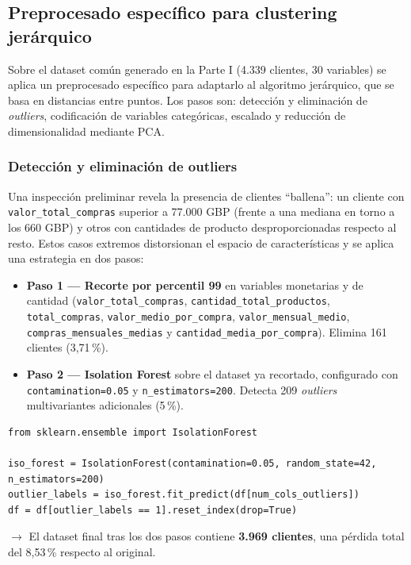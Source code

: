 \documentclass[11pt,a4paper]{article}
\begin{document}
\subsection{Preprocesado específico para clustering jerárquico}

Sobre el dataset común generado en la Parte I (4.339 clientes, 30 variables) se aplica un preprocesado específico para adaptarlo al algoritmo jerárquico, que se basa en distancias entre puntos. Los pasos son: detección y eliminación de \textit{outliers}, codificación de variables categóricas, escalado y reducción de dimensionalidad mediante PCA.

\subsubsection{Detección y eliminación de outliers}

Una inspección preliminar revela la presencia de clientes ``ballena'': un cliente con \texttt{valor\_total\_compras} superior a 77.000 GBP (frente a una mediana en torno a los 660 GBP) y otros con cantidades de producto desproporcionadas respecto al resto. Estos casos extremos distorsionan el espacio de características y se aplica una estrategia en dos pasos:

\begin{itemize}
    \item \textbf{Paso 1 — Recorte por percentil 99} en variables monetarias y de cantidad (\texttt{valor\_total\_compras}, \texttt{cantidad\_total\_productos}, \texttt{total\_compras}, \texttt{valor\_medio\_por\_compra}, \texttt{valor\_mensual\_medio}, \texttt{compras\_mensuales\_medias} y \texttt{cantidad\_media\_por\_compra}). Elimina 161 clientes (3,71\,\%).
    \item \textbf{Paso 2 — Isolation Forest} sobre el dataset ya recortado, configurado con \texttt{contamination=0.05} y \texttt{n\_estimators=200}. Detecta 209 \textit{outliers} multivariantes adicionales (5\,\%).
\end{itemize}

\begin{lstlisting}
from sklearn.ensemble import IsolationForest

iso_forest = IsolationForest(contamination=0.05, random_state=42, n_estimators=200)
outlier_labels = iso_forest.fit_predict(df[num_cols_outliers])
df = df[outlier_labels == 1].reset_index(drop=True)
\end{lstlisting}

\noindent$\rightarrow$ El dataset final tras los dos pasos contiene \textbf{3.969 clientes}, una pérdida total del 8,53\,\% respecto al original.
\end{document}
